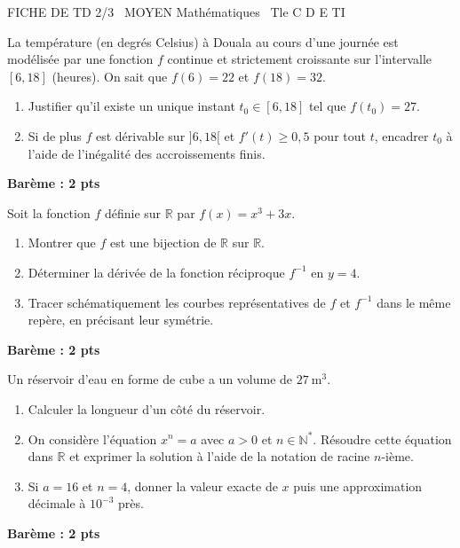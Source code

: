 \documentclass[11pt]{article}
\begin{document}
\begin{tcolorbox}[enhanced,colback=popink,colframe=popink,arc=10pt,boxrule=0pt,left=12pt,right=12pt,top=9pt,bottom=9pt]
{\color{white}\popxbold\small FICHE DE TD 2/3 \textbullet\ MOYEN \hfill Mathématiques \textbullet\ Tle C D E TI\par}
\end{tcolorbox}
\vspace{4pt}
\begin{exercice}
La température (en degrés Celsius) à Douala au cours d'une journée est modélisée par une fonction $f$ continue et strictement croissante sur l'intervalle $[6, 18]$ (heures). On sait que $f(6) = 22$ et $f(18) = 32$.
\begin{enumerate}
    \item Justifier qu'il existe un unique instant $t_0 \in [6, 18]$ tel que $f(t_0) = 27$.
    \item Si de plus $f$ est dérivable sur $]6, 18[$ et $f'(t) \ge 0,5$ pour tout $t$, encadrer $t_0$ à l'aide de l'inégalité des accroissements finis.
\end{enumerate}
\textbf{Barème : 2 pts}
\end{exercice}

\begin{exercice}
Soit la fonction $f$ définie sur $\mathbb{R}$ par $f(x) = x^3 + 3x$.
\begin{enumerate}
    \item Montrer que $f$ est une bijection de $\mathbb{R}$ sur $\mathbb{R}$.
    \item Déterminer la dérivée de la fonction réciproque $f^{-1}$ en $y = 4$.
    \item Tracer schématiquement les courbes représentatives de $f$ et $f^{-1}$ dans le même repère, en précisant leur symétrie.
\end{enumerate}
\textbf{Barème : 2 pts}
\end{exercice}

\begin{exercice}
Un réservoir d'eau en forme de cube a un volume de $\SI{27}{\meter^3}$.
\begin{enumerate}
    \item Calculer la longueur d'un côté du réservoir.
    \item On considère l'équation $x^n = a$ avec $a > 0$ et $n \in \mathbb{N}^*$. Résoudre cette équation dans $\mathbb{R}$ et exprimer la solution à l'aide de la notation de racine $n$-ième.
    \item Si $a = 16$ et $n = 4$, donner la valeur exacte de $x$ puis une approximation décimale à $10^{-3}$ près.
\end{enumerate}
\textbf{Barème : 2 pts}
\end{exercice}
\end{document}
